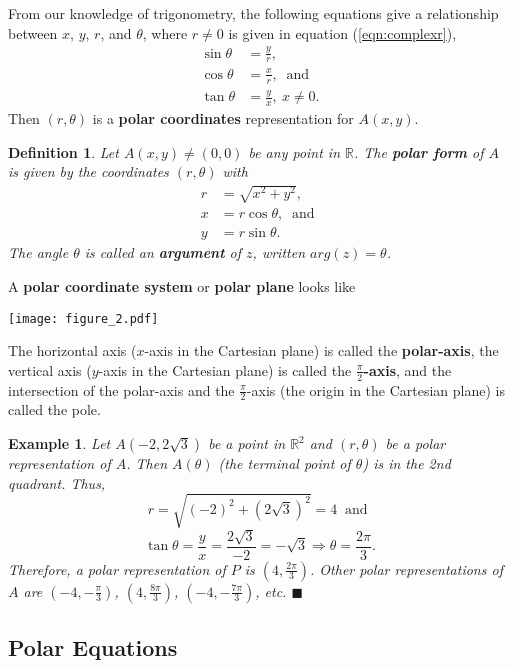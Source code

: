 \documentclass[12pt,twoside]{article}
\newtheorem{definition}[theorem]{\bf Definition}
\newtheorem{example}[theorem]{\bf Example}
\begin{document}
From our knowledge of trigonometry, the following equations give a relationship between $x$, $y$, $r$, and $\theta$, where $r\neq 0$ is given in equation (\ref{eqn:complexr}),
\begin{align*}
\sin\theta &= \frac{y}{r},\\
\cos\theta &= \frac{x}{r},\ \text{ and }\\
\tan\theta &= \frac{y}{x},\ x\neq 0.
\end{align*}
Then $(r,\theta)$ is a \textbf{polar coordinates} representation for $A(x,y)$.

\begin{definition}\rm\cite{sm}
Let $A(x,y)\neq (0,0)$ be any point in $\mathbb{R}$. The \textbf{polar form} of $A$ is given by the coordinates $(r,\theta)$ with
\begin{align*}
r &= \sqrt{x^2+y^2},\\
x &=r\cos\theta,\ \text{ and }\\
y &= r\sin\theta.
\end{align*}
The angle $\theta$ is called an \textbf{argument} of $z$, written $arg(z)=\theta$.
\end{definition}

A \textbf{polar coordinate system} or \textbf{polar plane} looks like

\begin{center}
\texttt{[image: figure\_2.pdf]}
\end{center}

The horizontal axis ($x$-axis in the Cartesian plane) is called the {\bf polar-axis}, the vertical axis ($y$-axis in the Cartesian plane) is called the {\bf $\frac{\pi}{2}$-axis}, and the intersection of the polar-axis and the $\frac{\pi}{2}$-axis (the origin in the Cartesian plane) is called the pole.

\begin{example}\rm
Let $A(-2,2\sqrt{3})$ be a point in $\mathbb{R}^2$ and $(r,\theta)$ be a polar representation of $A$. Then $A(\theta)$ (the {\it terminal point} of $\theta$) is in the 2nd quadrant. Thus,
$$r=\sqrt{(-2)^2+(2\sqrt{3})^2}=4\ \text{ and }$$
$$\tan\theta=\frac{y}{x}=\frac{2\sqrt{3}}{-2}=-\sqrt{3}\Rightarrow \theta=\frac{2\pi}{3}.$$
Therefore, a polar representation of $P$ is $(4,\frac{2\pi}{3})$. Other polar representations of $A$ are $(-4,-\frac{\pi}{3})$, $(4,\frac{8\pi}{3})$, $(-4,-\frac{7\pi}{3})$, etc. \hfill $\blacksquare$
\end{example}

\subsection{Polar Equations}
\end{document}

